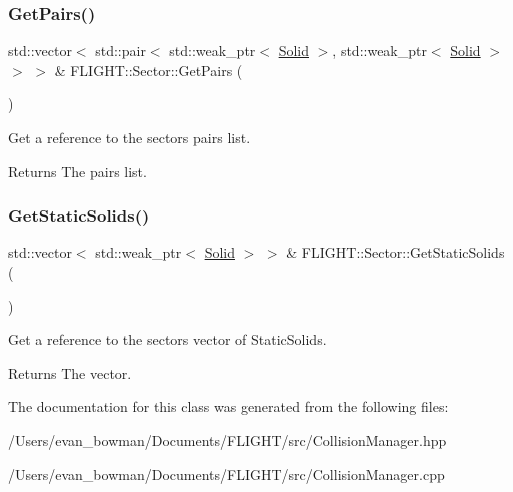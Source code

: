 \subsubsection{\texorpdfstring{Get\+Pairs()}{GetPairs()}}
{\footnotesize\ttfamily std\+::vector$<$ std\+::pair$<$ std\+::weak\+\_\+ptr$<$ \hyperlink{class_f_l_i_g_h_t_1_1_solid}{Solid} $>$, std\+::weak\+\_\+ptr$<$ \hyperlink{class_f_l_i_g_h_t_1_1_solid}{Solid} $>$ $>$ $>$ \& F\+L\+I\+G\+H\+T\+::\+Sector\+::\+Get\+Pairs (\begin{DoxyParamCaption}{ }\end{DoxyParamCaption})}



Get a reference to the sector\textquotesingle{}s pairs list. 

\begin{DoxyReturn}{Returns}
The pairs list. 
\end{DoxyReturn}
\mbox{\label{class_f_l_i_g_h_t_1_1_sector_a55c801db9199499baa26d65681e23fd3}} 
\subsubsection{\texorpdfstring{Get\+Static\+Solids()}{GetStaticSolids()}}
{\footnotesize\ttfamily std\+::vector$<$ std\+::weak\+\_\+ptr$<$ \hyperlink{class_f_l_i_g_h_t_1_1_solid}{Solid} $>$ $>$ \& F\+L\+I\+G\+H\+T\+::\+Sector\+::\+Get\+Static\+Solids (\begin{DoxyParamCaption}{ }\end{DoxyParamCaption})}



Get a reference to the sector\textquotesingle{}s vector of Static\+Solids. 

\begin{DoxyReturn}{Returns}
The vector. 
\end{DoxyReturn}


The documentation for this class was generated from the following files\+:\begin{DoxyCompactItemize}
\item 
/\+Users/evan\+\_\+bowman/\+Documents/\+F\+L\+I\+G\+H\+T/src/Collision\+Manager.\+hpp\item 
/\+Users/evan\+\_\+bowman/\+Documents/\+F\+L\+I\+G\+H\+T/src/Collision\+Manager.\+cpp\end{DoxyCompactItemize}
